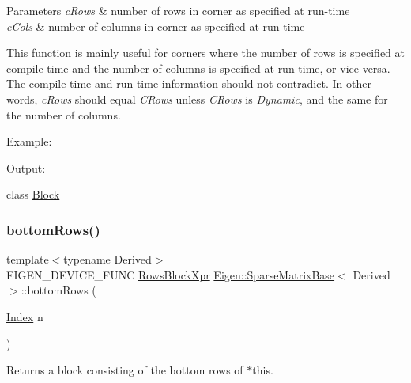 \begin{DoxyParams}{Parameters}
{\em c\+Rows} & number of rows in corner as specified at run-\/time \\
\hline
{\em c\+Cols} & number of columns in corner as specified at run-\/time\\
\hline
\end{DoxyParams}
This function is mainly useful for corners where the number of rows is specified at compile-\/time and the number of columns is specified at run-\/time, or vice versa. The compile-\/time and run-\/time information should not contradict. In other words, {\itshape c\+Rows} should equal {\itshape C\+Rows} unless {\itshape C\+Rows} is {\itshape Dynamic}, and the same for the number of columns.

Example\+: 
\begin{DoxyCodeInclude}{0}
\end{DoxyCodeInclude}
 Output\+: 
\begin{DoxyVerbInclude}
\end{DoxyVerbInclude}
 class \mbox{\hyperlink{class_eigen_1_1_block}{Block}} \mbox{\label{class_eigen_1_1_sparse_matrix_base_a3035db49593e0d16a16e93a5cb405d02}} 
\subsubsection{\texorpdfstring{bottomRows()}{bottomRows()}\hspace{0.1cm}{\footnotesize\ttfamily [1/2]}}
{\footnotesize\ttfamily template$<$typename Derived$>$ \\
E\+I\+G\+E\+N\+\_\+\+D\+E\+V\+I\+C\+E\+\_\+\+F\+U\+NC \mbox{\hyperlink{class_eigen_1_1_block}{Rows\+Block\+Xpr}} \mbox{\hyperlink{class_eigen_1_1_sparse_matrix_base}{Eigen\+::\+Sparse\+Matrix\+Base}}$<$ Derived $>$\+::bottom\+Rows (\begin{DoxyParamCaption}\item[{\mbox{\hyperlink{struct_eigen_1_1_eigen_base_a554f30542cc2316add4b1ea0a492ff02}{Index}}}]{n }\end{DoxyParamCaption})\hspace{0.3cm}{\ttfamily [inline]}}

\begin{DoxyReturn}{Returns}
a block consisting of the bottom rows of $\ast$this.
\end{DoxyReturn}

